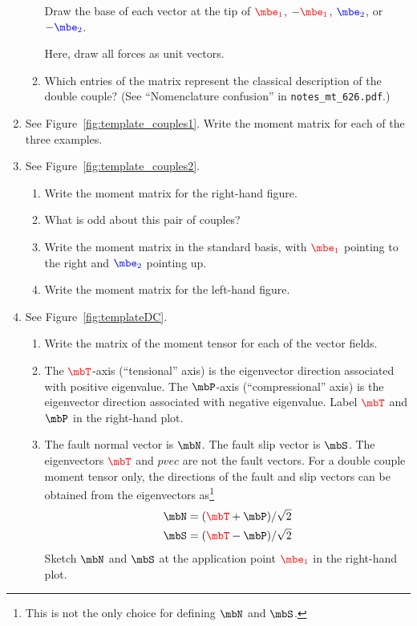 \documentclass[11pt,titlepage,fleqn]{article}
\newcommand{\mtfile}{\texttt{notes\_mt\_626.pdf}}
\newcommand{\fvect}{\textcolor{red}{\mbT}}
\newcommand{\fvecp}{\textcolor{black}{\mbP}}
\newcommand{\fvecn}{\mbN}
\newcommand{\fvecs}{\mbS}
\newcommand{\eone}{\textcolor{red}{\mbe_1}}
\newcommand{\etwo}{\textcolor{blue}{\mbe_2}}
\begin{document}
\begin{enumerate}
\begin{enumerate}
Draw the base of each vector at the tip of $\eone$, $-\eone$, $\etwo$, or $-\etwo$.

Here, draw all forces as unit vectors. 

\item Which entries of the matrix represent the classical description of the double couple?
(See ``Nomenclature confusion'' in \mtfile.)
\end{enumerate}


\item 
\label{prob:couples1}
See Figure~\ref{fig:template_couples1}.
Write the moment matrix for each of the three examples.


\item
\label{prob:couples2}
See Figure~\ref{fig:template_couples2}.
%
\begin{enumerate}
\item Write the moment matrix for the right-hand figure.
\item What is odd about this pair of couples?
\item Write the moment matrix in the standard basis, with $\eone$ pointing to the right and $\etwo$ pointing up.
\item Write the moment matrix for the left-hand figure.
\end{enumerate}


\item 
\label{prob:DC}
See Figure~\ref{fig:templateDC}.
%
\begin{enumerate}
\item Write the matrix of the moment tensor for each of the vector fields.

\item The $\fvect$-axis (``tensional'' axis) is the eigenvector direction associated with positive eigenvalue. The $\fvecp$-axis (``compressional'' axis) is the eigenvector direction associated with negative eigenvalue. Label $\fvect$ and $\fvecp$ in the right-hand plot.

\item The fault normal vector is $\fvecn$. The fault slip vector is $\fvecs$.
The eigenvectors $\fvect$ and $pvec$ are not the fault vectors. For a double couple moment tensor only, the directions of the fault and slip vectors can be obtained from the eigenvectors as\footnote{This is not the only choice for defining $\fvecn$ and $\fvecs$.}
%
\begin{eqnarray*}
\fvecn = (\fvect + \fvecp)/\sqrt{2}
\\
\fvecs = (\fvect - \fvecp)/\sqrt{2}
\end{eqnarray*}
%
Sketch $\fvecn$ and $\fvecs$ at the application point $\eone$ in the right-hand plot.


\end{enumerate}
\end{enumerate}
\end{document}
